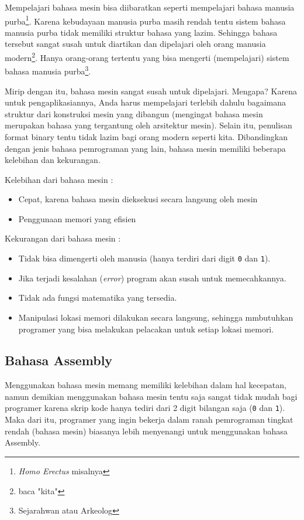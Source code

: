 Mempelajari bahasa mesin bisa diibaratkan seperti mempelajari bahasa manusia purba\footnote{\textit{Homo Erectus} misalnya}. Karena kebudayaan manusia purba masih rendah tentu sistem bahasa manusia purba tidak memiliki struktur bahasa yang lazim. Sehingga bahasa tersebut sangat susah untuk diartikan dan dipelajari oleh orang manusia modern\footnote{baca "kita"}. Hanya orang-orang tertentu yang bisa mengerti (mempelajari) sistem bahasa manusia purba\footnote{Sejarahwan atau Arkeolog}. 

Mirip dengan itu, bahasa mesin sangat susah untuk dipelajari. Mengapa? Karena untuk pengaplikasiannya, Anda harus mempelajari terlebih dahulu bagaimana struktur dari konstruksi mesin yang dibangun (mengingat bahasa mesin merupakan bahasa yang tergantung oleh arsitektur mesin). Selain itu, penulisan format binary tentu tidak lazim bagi orang modern seperti kita. Dibandingkan dengan jenis bahasa pemrograman yang lain, bahasa mesin memiliki beberapa kelebihan dan kekurangan.

Kelebihan dari bahasa mesin :
\begin{itemize}
	\item Cepat, karena bahasa mesin dieksekusi secara langsung oleh mesin 
	\item Penggunaan memori yang efisien
\end{itemize}

Kekurangan dari bahasa mesin :
\begin{itemize}
	\item Tidak bisa dimengerti oleh manusia (hanya terdiri dari digit \texttt{0} dan \texttt{1}).
	\item Jika terjadi kesalahan (\textit{error}) program akan susah untuk memecahkannya.
	\item Tidak ada fungsi matematika yang tersedia.
	\item Manipulasi lokasi memori dilakukan secara langsung, sehingga mmbutuhkan programer yang bisa melakukan pelacakan untuk setiap lokasi memori.
\end{itemize}

\subsection{Bahasa Assembly}
Menggunakan bahasa mesin memang memiliki kelebihan dalam hal kecepatan, namun demikian menggunakan bahasa mesin tentu saja sangat tidak mudah bagi programer karena skrip kode hanya tediri dari 2 digit bilangan saja (\texttt{0} dan \texttt{1}). Maka dari itu, programer yang ingin bekerja dalam ranah pemrograman tingkat rendah (bahasa mesin) biasanya lebih menyenangi untuk menggunakan bahasa Assembly.


